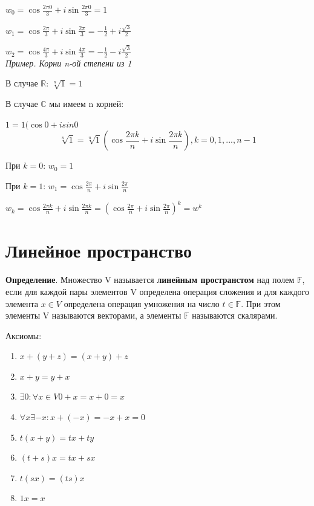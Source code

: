 \documentclass[a4paper]{article}
\begin{document}
{\begin{small}
$\displaystyle w_0 = \cos \frac{2 \pi 0}{3} + i \sin \frac{2 \pi 0}{3} = 1$

$\displaystyle w_1 = \cos \frac{2 \pi}{3} + i \sin \frac{2 \pi}{3} = -\frac{1}{2} + i\frac{\sqrt{3}}{2}$

$\displaystyle w_2 = \cos \frac{4 \pi}{3} + i \sin \frac{4 \pi}{3} = -\frac{1}{2} - i\frac{\sqrt{3}}{2}$\\

\textit{Пример. Корни n-ой степени из 1}

В случае $\mathbb{R}$: $\sqrt[n]{1} = 1$

В случае $\mathbb{C}$ мы имеем n корней:

$1 = 1(\cos 0 + i sin 0$
\begin{equation}
\displaystyle \sqrt[n]{1} = \sqrt[n]{1} \left( \cos \frac{2\pi k}{n} + i \sin \frac{2 \pi k}{n} \right), k=0,1,...,n-1
\end{equation}


При $k=0$: $w_0 = 1$

При $k=1$: $\displaystyle w_1 = \cos \frac{2\pi}{n} + i \sin \frac{2\pi}{n}$

$\displaystyle w_k = \cos \frac{2\pi k}{n} + i \sin \frac{2 \pi k}{n} = \left( \cos \frac{2\pi}{n} + i \sin \frac{2 \pi}{n} \right)^k = w^k$



\section*{Линейное пространство}
\textbf{Определение}. Множество V называется \textbf{линейным пространстом} над полем $\mathbb{F}$, если для каждой пары элементов V определена операция сложения и для каждого элемента $x \in V$ определена операция умножения на число $t \in \mathbb{F}$. При этом элементы V называются векторами, а элементы $\mathbb{F}$ называются скалярами.

Аксиомы:
\begin{enumerate}
\item $x+(y+z) = (x+y)+z$
\item $x+y=y+x$
\item $\exists 0: \forall x \in V 0 + x = x + 0 = x$
\item $\forall x \exists -x: x + (-x) = -x + x = 0$
\item $t(x+y) = tx + ty$
\item $(t+s)x = tx + sx$
\item $t(sx) = (ts)x$
\item $1x = x$
\end{enumerate}



\end{small}}
\end{document}

